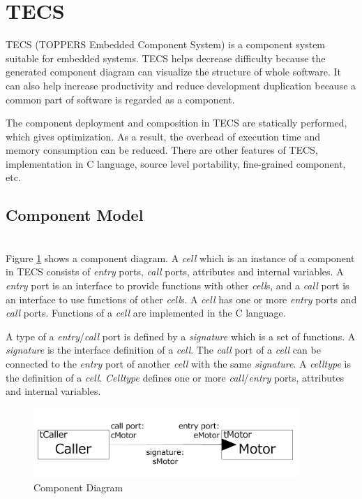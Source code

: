 \documentclass[a4j,12pt,oneside,openany,english]{jsbook}
\begin{document}
\section{TECS}
\label{sec:TECS}
TECS (TOPPERS Embedded Component System) is a component system suitable for embedded systems.
TECS helps decrease difficulty because the generated component diagram can visualize the structure of whole software.
It can also help increase productivity and reduce development duplication because a common part of software is regarded as a component.

The component deployment and composition in TECS are statically performed, which gives optimization.
As a result, the overhead of execution time and memory consumption can be reduced.
There are other features of TECS, implementation in C language, source level portability, fine-grained component, etc.

\subsection{Component Model}\mbox{}\\

Figure \ref{fig:component} shows a component diagram.
A {\it cell} which is an instance of a component in TECS consists of {\it entry} ports, {\it call} ports, attributes and internal variables.
A {\it entry} port is an interface to provide functions with other {\it cell}s, and a {\it call} port is an interface to use functions of other {\it cell}s.
A {\it cell} has one or more {\it entry} ports and {\it call} ports.
Functions of a {\it cell} are implemented in the C language.

A type of a {\it entry}/{\it call} port is defined by a {\it signature} which is a set of functions.
A {\it signature} is the interface definition of a {\it cell}.
The {\it call} port of a {\it cell} can be connected to the {\it entry} port of another {\it cell} with the same {\it signature}.
A {\it celltype} is the definition of a {\it cell}.
{\it Celltype} defines one or more {\it call}/{\it entry} ports, attributes and internal variables.

\begin{figure}[t]
    \centering
    \includegraphics[width=10cm,clip]{../EMSOFT2016/figure/component_diagram.pdf}
    \caption{Component Diagram}
    \label{fig:component}
\end{figure}
\end{document}
